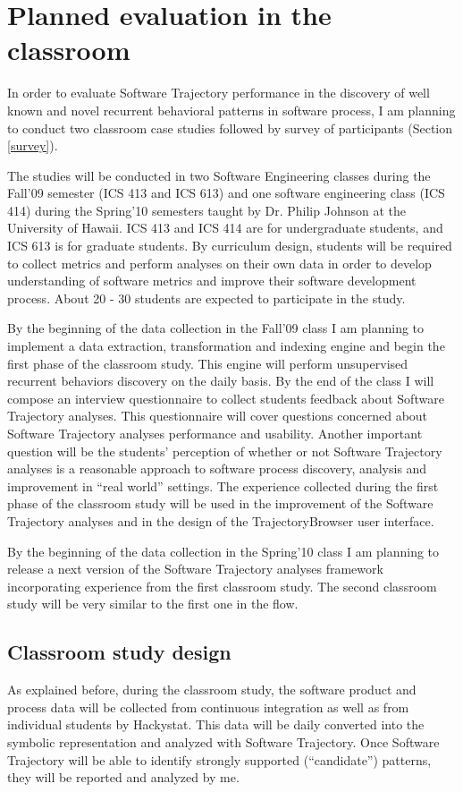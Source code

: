 \section{Planned evaluation in the classroom}\label{classroom}
In order to evaluate Software Trajectory performance in the discovery of well known and novel recurrent behavioral patterns in software process, I am planning to conduct two classroom case studies followed by survey of participants (Section \ref{survey}). 

The studies will be conducted in two Software Engineering classes during the Fall'09 semester (ICS 413 and ICS 613) and one software engineering class (ICS 414) during the Spring'10 semesters taught by Dr. Philip Johnson at the University of Hawaii. ICS 413 and ICS 414 are for undergraduate students, and ICS 613 is for graduate students. By curriculum design, students will be required to collect metrics and perform analyses on their own data in order to develop understanding of software metrics and improve their software development process. About 20 - 30 students are expected to participate in the study. 

By the beginning of the data collection in the Fall'09 class I am planning to implement a data extraction, transformation and indexing engine and begin the first phase of the classroom study. This engine will perform unsupervised recurrent behaviors discovery on the daily basis. By the end of the class I will compose an interview questionnaire to collect students feedback about Software Trajectory analyses. This questionnaire will cover questions concerned about Software Trajectory analyses performance and usability. Another important question will be the students' perception of whether or not Software Trajectory analyses is a reasonable approach to software process discovery, analysis and improvement in ``real world'' settings. The experience collected during the first phase of the classroom study will be used in the improvement of the Software Trajectory analyses and in the design of the TrajectoryBrowser user interface.

By the beginning of the data collection in the Spring'10 class I am planning to release a next version of the Software Trajectory analyses framework incorporating experience from the first classroom study. The second classroom study will be very similar to the first one in the flow. 

\subsection{Classroom study design}
As explained before, during the classroom study, the software product and process data will be collected from continuous integration as well as from individual students by Hackystat. This data will be daily converted into the symbolic representation and analyzed with Software Trajectory. Once Software Trajectory will be able to identify strongly supported (``candidate'') patterns, they will be reported and analyzed by me.

